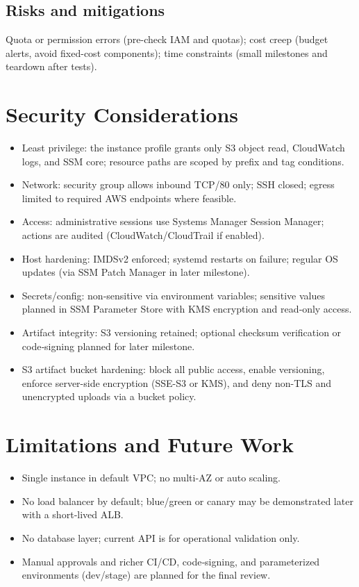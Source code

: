 \documentclass[12pt]{article}
\begin{document}
\subsection{Risks and mitigations}
Quota or permission errors (pre-check IAM and quotas); cost creep (budget alerts, avoid fixed-cost components); time constraints (small milestones and teardown after tests).

\section{Security Considerations}\label{sec:security}
\begin{itemize}
\item Least privilege: the instance profile grants only S3 object read, CloudWatch logs, and SSM core; resource paths are scoped by prefix and tag conditions.
\item Network: security group allows inbound TCP/80 only; SSH closed; egress limited to required AWS endpoints where feasible.
\item Access: administrative sessions use Systems Manager Session Manager; actions are audited (CloudWatch/CloudTrail if enabled).
\item Host hardening: IMDSv2 enforced; systemd restarts on failure; regular OS updates (via SSM Patch Manager in later milestone).
\item Secrets/config: non‑sensitive via environment variables; sensitive values planned in SSM Parameter Store with KMS encryption and read‑only access.
\item Artifact integrity: S3 versioning retained; optional checksum verification or code‑signing planned for later milestone.
\item S3 artifact bucket hardening: block all public access, enable versioning, enforce server-side encryption (SSE-S3 or KMS), and deny non-TLS and unencrypted uploads via a bucket policy.
\end{itemize}

\section{Limitations and Future Work}\label{sec:limitations}
\begin{itemize}
\item Single instance in default VPC; no multi‑AZ or auto scaling.
\item No load balancer by default; blue/green or canary may be demonstrated later with a short‑lived ALB.
\item No database layer; current API is for operational validation only.
\item Manual approvals and richer CI/CD, code‑signing, and parameterized environments (dev/stage) are planned for the final review.
\end{itemize}
\end{document}
